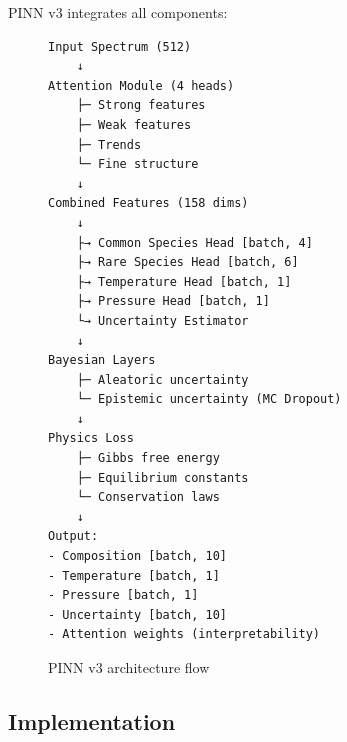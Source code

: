 \documentclass[12pt,a4paper,oneside]{report}
\begin{document}
PINN v3 integrates all components:

\begin{figure}[H]
\centering
\begin{verbatim}
Input Spectrum (512)
    ↓
Attention Module (4 heads)
    ├─ Strong features
    ├─ Weak features
    ├─ Trends
    └─ Fine structure
    ↓
Combined Features (158 dims)
    ↓
    ├→ Common Species Head [batch, 4]
    ├→ Rare Species Head [batch, 6]
    ├→ Temperature Head [batch, 1]
    ├→ Pressure Head [batch, 1]
    └→ Uncertainty Estimator
    ↓
Bayesian Layers
    ├─ Aleatoric uncertainty
    └─ Epistemic uncertainty (MC Dropout)
    ↓
Physics Loss
    ├─ Gibbs free energy
    ├─ Equilibrium constants
    └─ Conservation laws
    ↓
Output:
- Composition [batch, 10]
- Temperature [batch, 1]
- Pressure [batch, 1]
- Uncertainty [batch, 10]
- Attention weights (interpretability)
\end{verbatim}
\caption{PINN v3 architecture flow}
\end{figure}

\subsection{Implementation}
\end{document}
